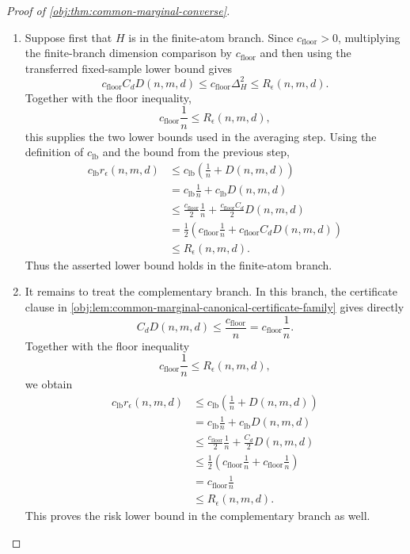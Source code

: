 \documentclass[11pt]{article}
\begin{document}
\begin{proof}[Proof of \cref{obj:thm:common-marginal-converse}]
\begin{enumerate}
\item Suppose first that \(H\) is in the finite-atom branch.  Since \(c_{\mathrm{floor}}>0\), multiplying the finite-branch dimension comparison by \(c_{\mathrm{floor}}\) and then using the transferred fixed-sample lower bound gives
\[
c_{\mathrm{floor}}C_dD(n,m,d)
\le
c_{\mathrm{floor}}\Delta_H^2
\le
R_\epsilon(n,m,d).
\]
Together with the floor inequality,
\[
c_{\mathrm{floor}}\frac1n\le R_\epsilon(n,m,d),
\]
this supplies the two lower bounds used in the averaging step.  Using the definition of \(c_{\mathrm{lb}}\) and the bound from the previous step,
\[
\begin{aligned}
c_{\mathrm{lb}} r_\epsilon(n,m,d)
&\le
c_{\mathrm{lb}}\left(\frac1n+D(n,m,d)\right)\\
&=
c_{\mathrm{lb}}\frac1n+c_{\mathrm{lb}} D(n,m,d)\\
&\le
\frac{c_{\mathrm{floor}}}{2}\frac1n
+\frac{c_{\mathrm{floor}}C_d}{2}D(n,m,d)\\
&=
\frac12\left(
c_{\mathrm{floor}}\frac1n
+
c_{\mathrm{floor}}C_dD(n,m,d)
\right)\\
&\le R_\epsilon(n,m,d).
\end{aligned}
\]
Thus the asserted lower bound holds in the finite-atom branch. %

\item It remains to treat the complementary branch.  In this branch, the certificate clause in \cref{obj:lem:common-marginal-canonical-certificate-family} gives directly
\[
C_dD(n,m,d)
\le
\frac{c_{\mathrm{floor}}}{n}
=
c_{\mathrm{floor}}\frac1n.
\]
Together with the floor inequality
\[
c_{\mathrm{floor}}\frac1n\le R_\epsilon(n,m,d),
\]
we obtain
\[
\begin{aligned}
c_{\mathrm{lb}} r_\epsilon(n,m,d)
&\le
c_{\mathrm{lb}}\left(\frac1n+D(n,m,d)\right)\\
&=
c_{\mathrm{lb}}\frac1n+c_{\mathrm{lb}} D(n,m,d)\\
&\le
\frac{c_{\mathrm{floor}}}{2}\frac1n
+\frac{C_d}{2}D(n,m,d)\\
&\le
\frac12\left(
c_{\mathrm{floor}}\frac1n+
c_{\mathrm{floor}}\frac1n
\right)\\
&=
c_{\mathrm{floor}}\frac1n\\
&\le R_\epsilon(n,m,d).
\end{aligned}
\]
This proves the risk lower bound in the complementary branch as well. %


\end{enumerate}
\end{proof}
\end{document}
